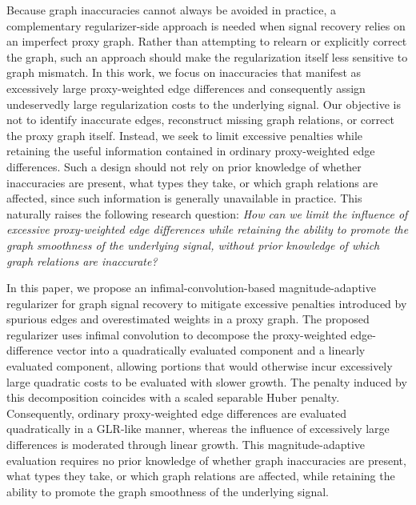 Because graph inaccuracies cannot always be avoided in practice, a complementary regularizer-side approach is needed when signal recovery relies on an imperfect proxy graph.
Rather than attempting to relearn or explicitly correct the graph, such an approach should make the regularization itself less sensitive to graph mismatch.
In this work, we focus on inaccuracies that manifest as excessively large proxy-weighted edge differences and consequently assign undeservedly large regularization costs to the underlying signal.
Our objective is not to identify inaccurate edges, reconstruct missing graph relations, or correct the proxy graph itself.
Instead, we seek to limit excessive penalties while retaining the useful information contained in ordinary proxy-weighted edge differences.
Such a design should not rely on prior knowledge of whether inaccuracies are present, what types they take, or which graph relations are affected, since such information is generally unavailable in practice.
This naturally raises the following research question:
\emph{How can we limit the influence of excessive proxy-weighted edge differences while retaining the ability to promote the graph smoothness of the underlying signal, without prior knowledge of which graph relations are inaccurate?}

In this paper, we propose an infimal-convolution-based magnitude-adaptive regularizer for graph signal recovery to mitigate excessive penalties introduced by spurious edges and overestimated weights in a proxy graph.
The proposed regularizer uses infimal convolution to decompose the proxy-weighted edge-difference vector into a quadratically evaluated component and a linearly evaluated component, allowing portions that would otherwise incur excessively large quadratic costs to be evaluated with slower growth.
The penalty induced by this decomposition coincides with a scaled separable Huber penalty.
Consequently, ordinary proxy-weighted edge differences are evaluated quadratically in a GLR-like manner, whereas the influence of excessively large differences is moderated through linear growth.
This magnitude-adaptive evaluation requires no prior knowledge of whether graph inaccuracies are present, what types they take, or which graph relations are affected, while retaining the ability to promote the graph smoothness of the underlying signal.

